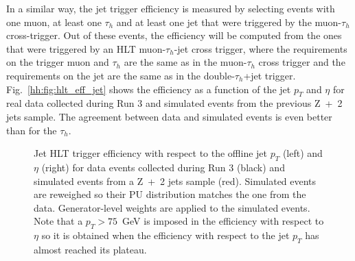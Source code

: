 \documentclass[../main.tex]{subfiles}
\begin{document}
In a similar way, the jet trigger efficiency is measured by selecting events with one muon, at least one $\tau_h$ and at least one jet that were triggered by the muon-$\tau_h$ cross-trigger. Out of these events, the efficiency will be computed from the ones that were triggered by an HLT muon-$\tau_h$-jet cross trigger, where the requirements on the trigger muon and $\tau_h$ are the same as in the muon-$\tau_h$ cross trigger and the requirements on the jet are the same as in the double-$\tau_h$+jet trigger. Fig.~\ref{hh:fig:hlt_eff_jet} shows the efficiency as a function of the jet $p_T$ and $\eta$ for real data collected during Run 3 and simulated events from the previous Z~+~2 jets sample. The agreement between data and simulated events is even better than for the $\tau_h$.

\begin{figure}[h!]
\begin{center}
\end{center}
\caption{Jet HLT trigger efficiency with respect to the offline jet $p_T$ (left) and $\eta$ (right) for data events collected during Run 3 (black) and simulated events from a Z~+~2 jets sample (red). Simulated events are reweighed so their PU distribution matches the one from the data. Generator-level weights are applied to the simulated events. Note that a $p_T>75$~GeV is imposed in the efficiency with respect to $\eta$ so it is obtained when the efficiency with respect to the jet $p_T$ has almost reached its plateau.}
\label{hh:fig:hlt_eff_tau}
\end{figure}
\end{document}
